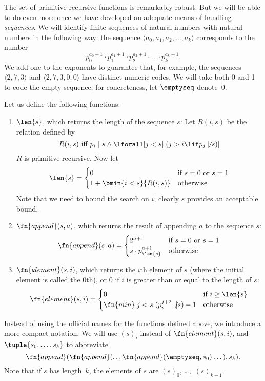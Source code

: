 \documentclass[../../../include/open-logic-section]{subfiles}
\begin{document}

The set of primitive recursive functions is
remarkably robust. But we will be able to do even more once we have
developed an adequate means of handling \emph{sequences}. We will
identify finite sequences of natural numbers with natural numbers in
the following way: the sequence $\langle a_0, a_1, a_2, \dots, a_k \rangle$
corresponds to the number
\[
p_0^{a_0+1} \cdot p_1^{a_1+1} \cdot p_2^{a_2+1} \cdot \dots \cdot
p_k^{a_k+1}.
\]
We add one to the exponents to guarantee that, for example,
the sequences $\langle 2, 7, 3\rangle$ and $\langle 2, 7, 3, 0, 0 \rangle$ have
distinct numeric codes. We will take both 0 and 1 to code the empty
sequence; for concreteness, let $\emptyseq$ denote~$0$.

Let us define the following functions:
\begin{enumerate}
\item $\len{s}$, which returns the length of the sequence $s$:
Let $R(i, s)$ be the relation defined by
\[
R(i, s) \text{ iff }
p_i \mid s \land \lforall[j < s][(j > i \lif
  p_j \mathrel{\not\mid} s)]
\]
$R$ is primitive recursive. Now let
\[
\len{s} =
\begin{cases}
0 & \text{if $s = 0$ or $s = 1$} \\
1 + \bmin{i < s}{R(i, s)} & \text{otherwise}
\end{cases}
\]
Note that we need to bound the search on $i$; clearly $s$ provides an
acceptable bound.

\item $\fn{append}(s,a)$, which returns the result of appending $a$ to
  the sequence $s$:
\[
\fn{append}(s,a) =
\begin{cases}
  2^{a+1} & \text{if $s = 0$ or $s = 1$} \\
s \cdot p_{\len{s}}^{a+1} & \text{otherwise}
\end{cases}
\]
\item $\fn{element}(s,i)$, which returns the $i$th element of $s$
  (where the initial element is called the $0$th), or $0$ if $i$ is
  greater than or equal to the length of $s$:
\[
\fn{element}(s,i) =
\begin{cases}
  0 & \mbox{if $i \geq \len{s}$} \\
  \fn{min} \; {j < s} \; (p_i^{j+2} \not | s) - 1 & \text{otherwise}
\end{cases}
\]
\end{enumerate}

Instead of using the official names for the functions defined above,
we introduce a more compact notation. We will use $(s)_i$ instead of
$\fn{element}(s,i)$, and $\tuple{s_0, \dots, s_k}$ to abbreviate
\[
\fn{append}(\fn{append}(\dots \fn{append}(\emptyseq,s_0)
\dots),s_k).
\]
Note that if $s$ has length~$k$, the elements of $s$ are
$(s)_0$, \dots,~$(s)_{k-1}$.
\end{document}

